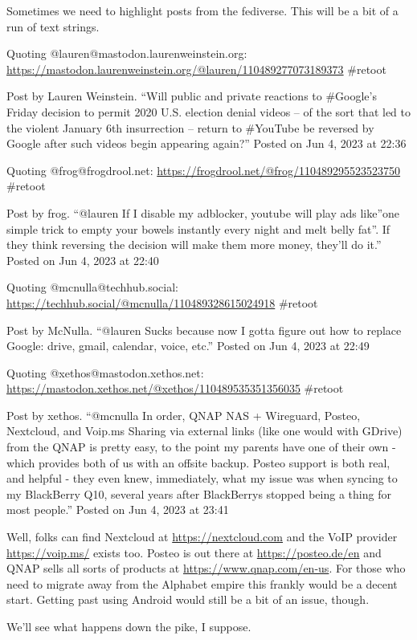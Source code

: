 Sometimes we need to highlight posts from the fediverse. This will be a
bit of a run of text strings.

Quoting @lauren@mastodon.laurenweinstein.org:
\url{https://mastodon.laurenweinstein.org/@lauren/110489277073189373}
\#retoot

Post by Lauren Weinstein. ``Will public and private reactions to
\#Google's Friday decision to permit 2020 U.S. election denial videos --
of the sort that led to the violent January 6th insurrection -- return
to \#YouTube be reversed by Google after such videos begin appearing
again?'' Posted on Jun 4, 2023 at 22:36

Quoting @frog@frogdrool.net:
\url{https://frogdrool.net/@frog/110489295523523750} \#retoot

Post by frog. ``@lauren If I disable my adblocker, youtube will play ads
like''one simple trick to empty your bowels instantly every night and
melt belly fat''. If they think reversing the decision will make them
more money, they'll do it.'' Posted on Jun 4, 2023 at 22:40

Quoting @mcnulla@techhub.social:
\url{https://techhub.social/@mcnulla/110489328615024918} \#retoot

Post by McNulla. ``@lauren Sucks because now I gotta figure out how to
replace Google: drive, gmail, calendar, voice, etc.'' Posted on Jun 4,
2023 at 22:49

Quoting @xethos@mastodon.xethos.net:
\url{https://mastodon.xethos.net/@xethos/110489535351356035} \#retoot

Post by xethos. ``@mcnulla In order, QNAP NAS + Wireguard, Posteo,
Nextcloud, and Voip.ms Sharing via external links (like one would with
GDrive) from the QNAP is pretty easy, to the point my parents have one
of their own - which provides both of us with an offsite backup. Posteo
support is both real, and helpful - they even knew, immediately, what my
issue was when syncing to my BlackBerry Q10, several years after
BlackBerrys stopped being a thing for most people.'' Posted on Jun 4,
2023 at 23:41

Well, folks can find Nextcloud at \url{https://nextcloud.com} and the
VoIP provider \url{https://voip.ms/} exists too. Posteo is out there at
\url{https://posteo.de/en} and QNAP sells all sorts of products at
\url{https://www.qnap.com/en-us}. For those who need to migrate away
from the Alphabet empire this frankly would be a decent start. Getting
past using Android would still be a bit of an issue, though.

We'll see what happens down the pike, I suppose.
